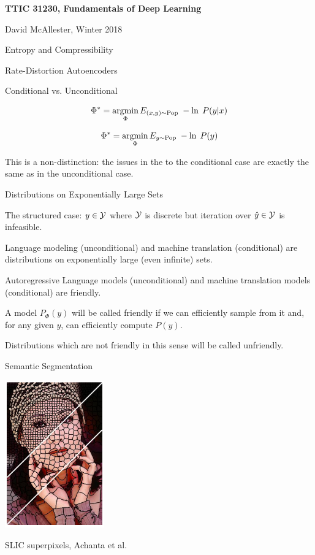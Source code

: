 





{\Huge

  \centerline{\bf TTIC 31230, Fundamentals of Deep Learning}
  \bigskip
  \centerline{David McAllester, Winter 2018}
  \vfill
  \centerline{Entropy and Compressibility}
  \vfill
  \centerline{Rate-Distortion Autoencoders}

{Conditional vs. Unconditional}

\vfill
$$\Phi^* = \operatorname*{argmin}_\Phi E_{(x,y) \sim \mathrm{Pop}}\;-\ln \;P(y|x)$$

\vfill
$$\Phi^* = \operatorname*{argmin}_\Phi E_{y \sim \mathrm{Pop}}\;-\ln \;P(y)$$

\vfill
This is a non-distinction: the issues in the to the conditional case
are exactly the same as in the unconditional case.

{Distributions on Exponentially Large Sets}

The structured case: $y \in {\cal Y}$ where ${\cal Y}$ is discrete but iteration over $\hat{y} \in {\cal Y}$ is infeasible.

\vfill
Language modeling (unconditional) and machine translation (conditional) are distributions on exponentially large (even infinite) sets.


\vfill
Autoregressive Language models (unconditional) and machine translation models (conditional) are {\color{red} friendly}.


\vfill
A model $P_\Phi(y)$ will be called {\color{red} friendly} if we can efficiently sample from it and, for any given $y$, can efficiently compute $P(y)$.

\vfill
Distributions which are not friendly in this sense will be called {\color{red} unfriendly}.

{Semantic Segmentation}
\centerline{\includegraphics[height = 2.5in]{../images/SLICcolor}}
\centerline{\huge SLIC superpixels, Achanta et al.}

}
